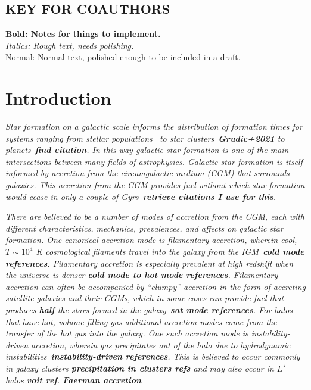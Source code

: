 \documentclass[fleqn,usenatbib]{mnras}
\begin{document}
\subsection{ KEY FOR COAUTHORS}
\textbf{Bold: Notes for things to implement.} \\
\textit{Italics: Rough text, needs polishing.} \\
Normal: Normal text, polished enough to be included in a draft.

\section{Introduction}
\label{s: introduction}

\textit{
Star formation on a galactic scale informs the distribution of formation times for systems ranging from stellar populations~\cite{Yu2021} to star clusters~\textbf{Grudic+2021} to planets~\textbf{find citation}.
In this way galactic star formation is one of the main intersections between many fields of astrophysics.
Galactic star formation is itself informed by accretion from the circumgalactic medium (CGM) that surrounds galaxies.
This accretion from the CGM provides fuel without which star formation would cease in only a couple of Gyrs~\textbf{retrieve citations I use for this}.
}

\textit{
There are believed to be a number of modes of accretion from the CGM, each with different characteristics, mechanics, prevalences, and affects on galactic star formation.
One canonical accretion mode is filamentary accretion, wherein cool, $T \sim 10^4$ K cosmological filaments travel into the galaxy  from the IGM~\textbf{cold mode references}.
Filamentary accretion is especially prevalent at high redshift when the universe is denser \textbf{cold mode to hot mode references}.
Filamentary accretion can often be accompanied by ``clumpy'' accretion in the form of accreting satellite galaxies and their CGMs, which in some cases can provide fuel that produces \textbf{half} the stars formed in the galaxy~\textbf{sat mode references}.
For halos that have hot, volume-filling gas additional accretion modes come from the transfer of the hot gas into the galaxy.
One such accretion mode is instability-driven accretion, wherein gas precipitates out of the halo due to hydrodynamic instabilities~\textbf{instability-driven references}.
This is believed to occur commonly in galaxy clusters \textbf{precipitation in clusters refs} and may also occur in $L^\star$ halos \textbf{voit ref}.
\textbf{Faerman accretion}
}
\end{document}
